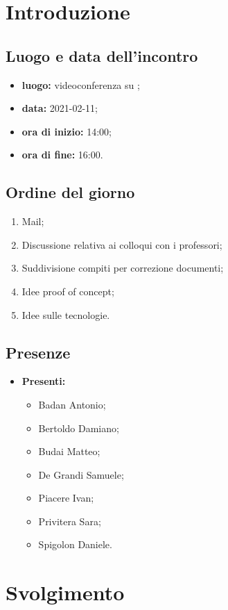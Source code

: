 \section*{Introduzione}
\subsection*{Luogo e data dell'incontro}
\begin{itemize}
\item \textbf{luogo:} videoconferenza su ;
\item \textbf{data:} 2021-02-11;
\item \textbf{ora di inizio:} 14:00;
\item \textbf{ora di fine:} 16:00.
\end{itemize}

\subsection*{Ordine del giorno}
\begin{enumerate}
	\item Mail;
	\item Discussione relativa ai colloqui con i professori;
	\item Suddivisione compiti per correzione documenti;
	\item Idee proof of concept;
	\item Idee sulle tecnologie.
\end{enumerate}

\subsection*{Presenze}
\begin{itemize}
	\item \textbf{Presenti:}
	\begin{itemize}
		\item Badan Antonio;
		\item Bertoldo Damiano;
		\item Budai Matteo;
		\item De Grandi Samuele;
		\item Piacere Ivan;
		\item Privitera Sara;
		\item Spigolon Daniele.
	\end{itemize}
\end{itemize}

\section*{Svolgimento}
